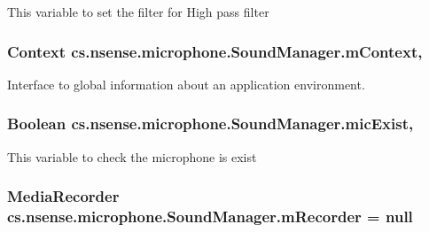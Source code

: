 This variable to set the filter for High pass filter \hypertarget{classcs_1_1nsense_1_1microphone_1_1_sound_manager_a8a4a3c39bea101e98f8ce22decb085d5}{
\subsubsection[{m\-Context}]{\setlength{\rightskip}{0pt plus 5cm}Context cs.\-nsense.\-microphone.\-Sound\-Manager.\-m\-Context\hspace{0.3cm}{\ttfamily [static]}, {\ttfamily [private]}}}\label{classcs_1_1nsense_1_1microphone_1_1_sound_manager_a8a4a3c39bea101e98f8ce22decb085d5}
Interface to global information about an application environment. \hypertarget{classcs_1_1nsense_1_1microphone_1_1_sound_manager_a84e00be6f0348b7352f0669635ce1bca}{
\subsubsection[{mic\-Exist}]{\setlength{\rightskip}{0pt plus 5cm}Boolean cs.\-nsense.\-microphone.\-Sound\-Manager.\-mic\-Exist\hspace{0.3cm}{\ttfamily [static]}, {\ttfamily [private]}}}\label{classcs_1_1nsense_1_1microphone_1_1_sound_manager_a84e00be6f0348b7352f0669635ce1bca}
This variable to check the microphone is exist \hypertarget{classcs_1_1nsense_1_1microphone_1_1_sound_manager_a854c1c483aca7d2a6a33b4a821236f4e}{
\subsubsection[{m\-Recorder}]{\setlength{\rightskip}{0pt plus 5cm}Media\-Recorder cs.\-nsense.\-microphone.\-Sound\-Manager.\-m\-Recorder = null\hspace{0.3cm}{\ttfamily [private]}}}\label{classcs_1_1nsense_1_1microphone_1_1_sound_manager_a854c1c483aca7d2a6a33b4a821236f4e}
